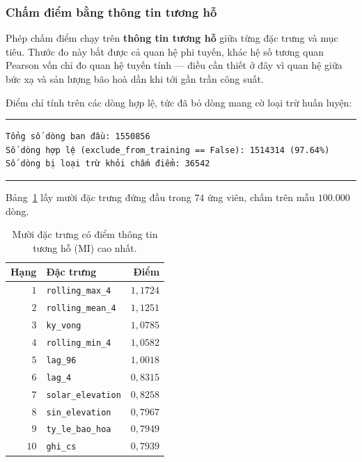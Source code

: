 \documentclass[12pt, a4paper]{report}
\begin{document}
\subsubsection{Chấm điểm bằng thông tin tương hỗ}

Phép chấm điểm chạy trên \textbf{thông tin tương hỗ} giữa từng đặc trưng và mục tiêu. Thước đo
này bắt được cả quan hệ phi tuyến, khác hệ số tương quan Pearson vốn chỉ đo quan hệ tuyến tính
--- điều cần thiết ở đây vì quan hệ giữa bức xạ và sản lượng bão hoà dần khi tới gần trần công
suất.

Điểm chỉ tính trên các dòng hợp lệ, tức đã bỏ dòng mang cờ loại trừ huấn luyện:

\begingroup
\par\vspace{6pt}\hrule\vspace{4pt}
\small\renewcommand{\baselinestretch}{1.0}\selectfont
\begin{verbatim}
Tổng số dòng ban đầu: 1550856
Số dòng hợp lệ (exclude_from_training == False): 1514314 (97.64%)
Số dòng bị loại trừ khỏi chấm điểm: 36542
\end{verbatim}
\vspace{2pt}\hrule\par\vspace{6pt}
\endgroup

Bảng~\ref{tab:mi} lấy mười đặc trưng đứng đầu trong $74$ ứng viên, chấm trên mẫu $100.000$ dòng.

\begin{table}[htbp]
\centering
\caption{Mười đặc trưng có điểm thông tin tương hỗ (MI) cao nhất.}
\label{tab:mi}
\small
\begin{tabular}{r l r}
\toprule
\textbf{Hạng} & \textbf{Đặc trưng} & \textbf{Điểm} \\
\midrule
$1$  & \texttt{rolling\_max\_4}   & $1{,}1724$ \\
$2$  & \texttt{rolling\_mean\_4}  & $1{,}1251$ \\
$3$  & \texttt{ky\_vong}         & $1{,}0785$ \\
$4$  & \texttt{rolling\_min\_4}   & $1{,}0582$ \\
$5$  & \texttt{lag\_96}          & $1{,}0018$ \\
$6$  & \texttt{lag\_4}           & $0{,}8315$ \\
$7$  & \texttt{solar\_elevation} & $0{,}8258$ \\
$8$  & \texttt{sin\_elevation}   & $0{,}7967$ \\
$9$  & \texttt{ty\_le\_bao\_hoa}   & $0{,}7949$ \\
$10$ & \texttt{ghi\_cs}          & $0{,}7939$ \\
\bottomrule
\end{tabular}
\end{table}
\end{document}
